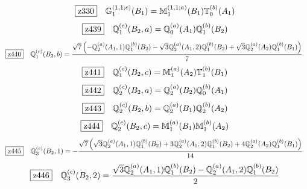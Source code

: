 \documentclass[fleqn,10pt,landscape]{jsarticle}
\begin{document}
\begin{dmath*}
\hspace*{3mm}\fbox{z330}\quad \mathbb{G}_{1}^{(1,1;c)}(B_{1})=\mathbb{M}_{1}^{(1,1;a)}(B_{1}) \mathbb{T}_{0}^{(b)}(A_{1})
\end{dmath*}
\begin{dmath*}
\hspace*{3mm}\fbox{z439}\quad \mathbb{Q}_{1}^{(c)}(B_{2},a)=\mathbb{Q}_{0}^{(a)}(A_{1}) \mathbb{Q}_{1}^{(b)}(B_{2})
\end{dmath*}
\begin{dmath*}
\hspace*{3mm}\fbox{z440}\quad \mathbb{Q}_{1}^{(c)}(B_{2},b)=\frac{\sqrt{7} \left(- \mathbb{Q}_{2}^{(a)}(A_{1},1) \mathbb{Q}_{1}^{(b)}(B_{2}) - \sqrt{3} \mathbb{Q}_{2}^{(a)}(A_{1},2) \mathbb{Q}_{1}^{(b)}(B_{2}) + \sqrt{3} \mathbb{Q}_{2}^{(a)}(A_{2}) \mathbb{Q}_{1}^{(b)}(B_{1})\right)}{7}
\end{dmath*}
\begin{dmath*}
\hspace*{3mm}\fbox{z441}\quad \mathbb{Q}_{1}^{(c)}(B_{2},c)=\mathbb{M}_{1}^{(a)}(A_{2}) \mathbb{T}_{1}^{(b)}(B_{1})
\end{dmath*}
\begin{dmath*}
\hspace*{3mm}\fbox{z442}\quad \mathbb{Q}_{2}^{(c)}(B_{2},a)=\mathbb{Q}_{2}^{(a)}(B_{2}) \mathbb{Q}_{0}^{(b)}(A_{1})
\end{dmath*}
\begin{dmath*}
\hspace*{3mm}\fbox{z443}\quad \mathbb{Q}_{2}^{(c)}(B_{2},b)=\mathbb{Q}_{2}^{(a)}(B_{1}) \mathbb{Q}_{2}^{(b)}(A_{2})
\end{dmath*}
\begin{dmath*}
\hspace*{3mm}\fbox{z444}\quad \mathbb{Q}_{2}^{(c)}(B_{2},c)=\mathbb{M}_{1}^{(a)}(B_{1}) \mathbb{M}_{1}^{(b)}(A_{2})
\end{dmath*}
\begin{dmath*}
\hspace*{3mm}\fbox{z445}\quad \mathbb{Q}_{3}^{(c)}(B_{2},1)=- \frac{\sqrt{7} \left(\sqrt{3} \mathbb{Q}_{2}^{(a)}(A_{1},1) \mathbb{Q}_{1}^{(b)}(B_{2}) + 3 \mathbb{Q}_{2}^{(a)}(A_{1},2) \mathbb{Q}_{1}^{(b)}(B_{2}) + 4 \mathbb{Q}_{2}^{(a)}(A_{2}) \mathbb{Q}_{1}^{(b)}(B_{1})\right)}{14}
\end{dmath*}
\begin{dmath*}
\hspace*{3mm}\fbox{z446}\quad \mathbb{Q}_{3}^{(c)}(B_{2},2)=\frac{\sqrt{3} \mathbb{Q}_{2}^{(a)}(A_{1},1) \mathbb{Q}_{1}^{(b)}(B_{2}) - \mathbb{Q}_{2}^{(a)}(A_{1},2) \mathbb{Q}_{1}^{(b)}(B_{2})}{2}
\end{dmath*}
\end{document}

